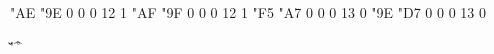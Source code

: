 \setcharcode  "AE  "9E    0    0     0  12  1  \texmacro \flqq
\setcharcode  "AF  "9F    0    0     0  12  1  \texmacro \frqq
\setcharcode  "F5  "A7    0    0     0  13  0  \expandto {\S}
\setcharcode  "9E  "D7    0    0     0  13  0  \expandto {$\times$}

\redefaccent \'
\redefaccent \v
\redefaccent \"
\redefaccent \^
\redefaccent \r

